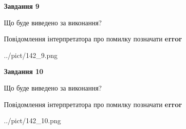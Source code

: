 \documentclass[12pt, ukrainian]{article}
\begin{document}
{{\begin {center}\textbf{Завдання 9}\end {center}}\par
Що буде виведено за виконання? \par
Повідомлення інтерпретатора про помилку позначати \textbf{error}

\begin{center}
	{../pict/142_9.png}
\end{center}
\newpage

{\begin {center}\textbf{Завдання 10}\end {center}}\par
Що буде виведено за виконання? \par
Повідомлення інтерпретатора про помилку позначати \textbf{error}

\begin{center}
	{../pict/142_10.png}
\end{center}
\newpage

}
\end{document}
